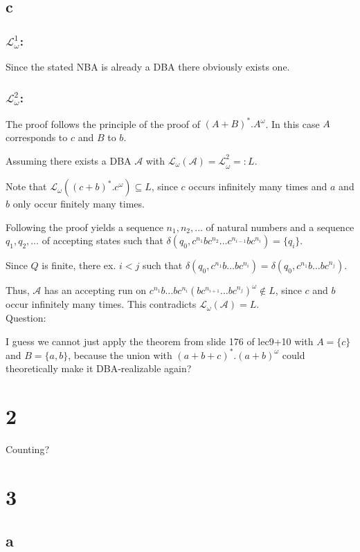 \documentclass[11pt]{article}
\begin{document}
\subsection{c}
\subsubsection*{$\mathcal{L}_\omega^1$:}
Since the stated NBA is already a DBA there obviously exists one.
\subsubsection*{$\mathcal{L}_\omega^2$:}

The proof follows the principle of the proof of $(A + B)^*.A^\omega$. In this case $A$ corresponds to $c$ and $B$ to $b$.

Assuming there exists a DBA $\mathcal{A}$ with $\mathcal{L_\omega(A) = L}_\omega^2 =: L$.

Note that $\mathcal{L}_\omega((c + b)^*.c^\omega) \subseteq L$, since $c$ occurs infinitely many times and $a$ and $b$ only occur finitely many times.

Following the proof yields a sequence $n_1, n_2, \ldots$ of natural numbers and a sequence $q_1, q_2, \ldots$ of accepting states such that $\delta(q_0, c^{n_1}bc^{n_2} \ldots c^{n_{i-1}}bc^{n_i}) = \{q_i\}$.

Since $Q$ is finite, there ex. $i < j$ such that $\delta(q_0, c^{n_1}b \ldots bc^{n_i}) = \delta(q_0, c^{n_1}b \ldots bc^{n_j})$.

Thus, $\mathcal{A}$ has an accepting run on $c^{n_1}b \ldots bc^{n_i} (bc^{n_{i+1}} \ldots bc^{n_j})^\omega \notin L$, since $c$ and $b$ occur infinitely many times.
This contradicts $\mathcal{L_\omega(A)} = L$.
\\

Question:

I guess we cannot just apply the theorem from slide 176 of lec9+10 with $A = \{c\}$ and $B = \{a, b\}$, because the union with $(a+b+c)^*.(a+b)^\omega$ could theoretically make it DBA-realizable again?

\section{2}
Counting?

\section{3}
\subsection{a}
\end{document}
